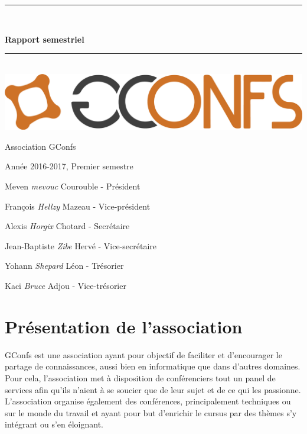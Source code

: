 \documentclass[12pt,a4paper]{article}
\newcommand{\HRule}{\rule{\linewidth}{0.5mm}}
\begin{document}
\begin{center}

\begingroup
\thispagestyle{empty}
\vspace*{1cm}
\HRule \\[0.8cm]
\par\normalfont\fontsize{35}{35}\sffamily\selectfont
\textbf{Rapport semestriel}\\
\HRule \\[2cm]
\includegraphics[scale=0.2]{gconfs_logo.png}\par
{\large Association GConfs}\par
\vspace*{1cm}
{\large Année 2016-2017, Premier semestre}\par
\vspace*{2cm}
\endgroup
\begingroup
\par\normalfont\fontsize{35}{16}\sffamily\selectfont
{\large Meven \emph{mevouc} Courouble - Président}\par
{\large François \emph{Hellzy} Mazeau - Vice-président}\par
{\large Alexis \emph{Horgix} Chotard - Secrétaire}\par
{\large Jean-Baptiste \emph{Zibe} Hervé - Vice-secrétaire}\par
{\large Yohann \emph{Shepard} Léon - Trésorier}\par
{\large Kaci \emph{Bruce} Adjou - Vice-trésorier}\par
\endgroup


\end{center}
\newpage

\setlength{\headheight}{15pt}
\pagestyle{fancy}
\author{Yohann LEON}
\renewcommand{\footrulewidth}{0.1 mm}

  \newpage
  \tableofcontents

\newpage

\section{Présentation de l'association}

GConfs est une association ayant pour objectif de faciliter et d’encourager le partage de
connaissances, aussi bien en informatique que dans d'autres domaines. Pour cela, l’association
met à disposition de conférenciers tout un panel de services afin qu’ils n’aient à se soucier que de leur sujet et de ce qui les passionne. \\
L’association organise également des conférences, principalement techniques ou
sur le monde du travail et ayant pour but d’enrichir le cursus par des thèmes s’y intégrant ou s’en éloignant.
\end{document}
